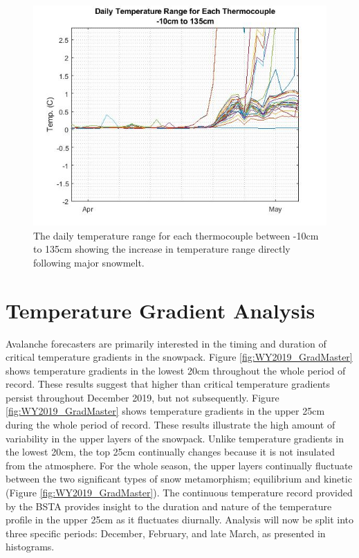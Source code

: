  \begin{figure}[H]
    \centering
    \includegraphics[width=0.8\linewidth]{figures/DailyTempRange_Isotherm.jpg}
    \caption{The daily temperature range for each thermocouple between -10cm to 135cm showing the increase in temperature range directly following major snowmelt.}
    \label{fig:DailyTempRange}
 \end{figure}
 
\section{Temperature Gradient Analysis}
Avalanche forecasters are primarily interested in the timing and duration of critical temperature gradients in the snowpack. Figure \ref{fig:WY2019_GradMaster} shows temperature gradients in the lowest 20cm throughout the whole period of record. These results suggest that higher than critical temperature gradients persist throughout December 2019, but not subsequently. Figure \ref{fig:WY2019_GradMaster} shows temperature gradients in the upper 25cm during the whole period of record. These results illustrate the high amount of variability in the upper layers of the snowpack. Unlike temperature gradients in the lowest 20cm, the top 25cm continually changes because it is not insulated from the atmosphere. For the whole season, the upper layers continually fluctuate between the two significant types of snow metamorphism; equilibrium and kinetic (Figure \ref{fig:WY2019_GradMaster}). The continuous temperature record provided by the BSTA provides insight to the duration and nature of the temperature profile in the upper 25cm as it fluctuates diurnally. Analysis will now be split into three specific periods: December, February, and late March, as presented in histograms. 

